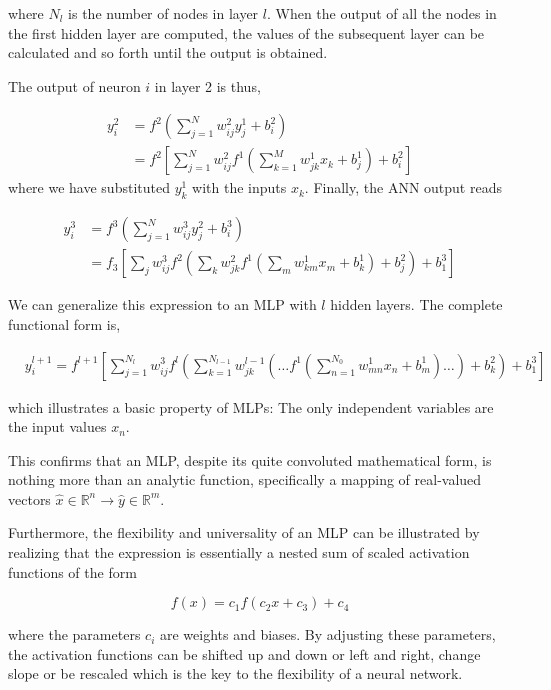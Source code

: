 \documentclass[%
oneside,                 %
final,                   %
10pt]{article}
\begin{document}
where $N_l$ is the number of nodes in layer $l$. When the output of
all the nodes in the first hidden layer are computed, the values of
the subsequent layer can be calculated and so forth until the output
is obtained.


The output of neuron $i$ in layer 2 is thus,

\begin{align}
 y_i^2 &= f^2\left(\sum_{j=1}^N w_{ij}^2 y_j^1 + b_i^2\right) \\
 &= f^2\left[\sum_{j=1}^N w_{ij}^2f^1\left(\sum_{k=1}^M w_{jk}^1 x_k + b_j^1\right) + b_i^2\right]
 \label{outputLayer2}
\end{align}
where we have substituted $y_k^1$ with the inputs $x_k$. Finally, the ANN output reads

\begin{align}
 y_i^3 &= f^3\left(\sum_{j=1}^N w_{ij}^3 y_j^2 + b_i^3\right) \\
 &= f_3\left[\sum_{j} w_{ij}^3 f^2\left(\sum_{k} w_{jk}^2 f^1\left(\sum_{m} w_{km}^1 x_m + b_k^1\right) + b_j^2\right)
  + b_1^3\right]
\end{align}


We can generalize this expression to an MLP with $l$ hidden
layers. The complete functional form is,

\begin{align}
&y^{l+1}_i = f^{l+1}\left[\!\sum_{j=1}^{N_l} w_{ij}^3 f^l\left(\sum_{k=1}^{N_{l-1}}w_{jk}^{l-1}\left(\dots f^1\left(\sum_{n=1}^{N_0} w_{mn}^1 x_n+ b_m^1\right)\dots\right)+b_k^2\right)+b_1^3\right] &&
 \label{completeNN}
\end{align}

which illustrates a basic property of MLPs: The only independent
variables are the input values $x_n$.


This confirms that an MLP, despite its quite convoluted mathematical
form, is nothing more than an analytic function, specifically a
mapping of real-valued vectors $\hat{x} \in \mathbb{R}^n \rightarrow
\hat{y} \in \mathbb{R}^m$.

Furthermore, the flexibility and universality of an MLP can be
illustrated by realizing that the expression is essentially a nested
sum of scaled activation functions of the form

\begin{equation}
 f(x) = c_1 f(c_2 x + c_3) + c_4
\end{equation}

where the parameters $c_i$ are weights and biases. By adjusting these
parameters, the activation functions can be shifted up and down or
left and right, change slope or be rescaled which is the key to the
flexibility of a neural network.
\end{document}
